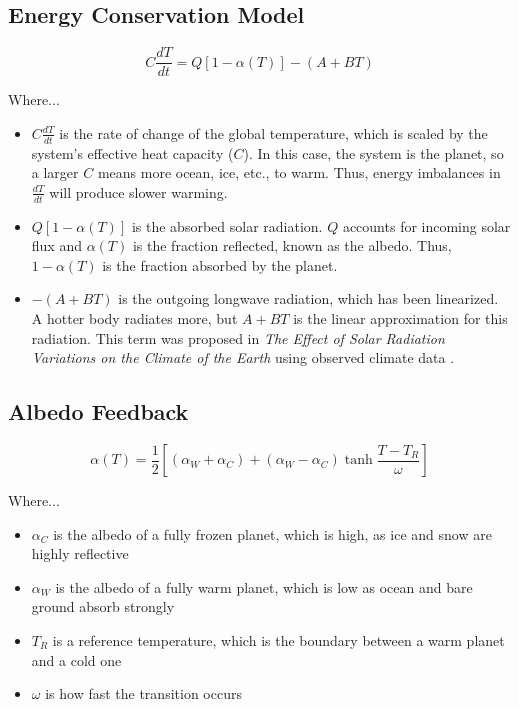     \subsection{Energy Conservation Model}\label{subsec:energy-conservation-model}

    \[
        C\frac{dT}{dt} = Q\left[1-\alpha(T) \right]-(A+BT)
    \]

    Where...

    \begin{itemize}

        \item $C\frac{dT}{dt}$ is the rate of change of the global temperature, which is scaled by the system's effective heat capacity ($C$). In this case, the system is the planet, so a larger $C$ means more ocean, ice, etc., to warm. Thus, energy imbalances in $\frac{dT}{dt}$ will produce slower warming.

        \item $Q\left[1-\alpha(T)\right]$ is the absorbed solar radiation. $Q$ accounts for incoming solar flux and $\alpha(T)$ is the fraction reflected, known as the albedo. Thus, $1-\alpha(T)$ is the fraction absorbed by the planet.

        \item $-(A+BT)$ is the outgoing longwave radiation, which has been linearized. A hotter body radiates more, but $A+BT$ is the linear approximation for this radiation. This term was proposed in \textit{The Effect of Solar Radiation Variations on the Climate of the Earth} using observed climate data \parencite{budykoEffectSolar1969}.

    \end{itemize}
   

    \subsection{Albedo Feedback}\label{subsec:albedo-feedback}

    \[
        \alpha(T)=\frac{1}{2}\left[\left(\alpha_W+\alpha_C\right)+\left(\alpha_W-\alpha_C\right)\tanh\frac{T-T_R}{\omega}\right]
    \]
    \parencite{dortmansEnergyBalance2019}

    Where...

    \begin{itemize}

        \item $\alpha_C$ is the albedo of a fully frozen planet, which is high, as ice and snow are highly reflective

        \item $\alpha_W$ is the albedo of a fully warm planet, which is low as ocean and bare ground absorb strongly

        \item $T_R$ is a reference temperature, which is the boundary between a warm planet and a cold one

        \item $\omega$ is how fast the transition occurs

    \end{itemize}

